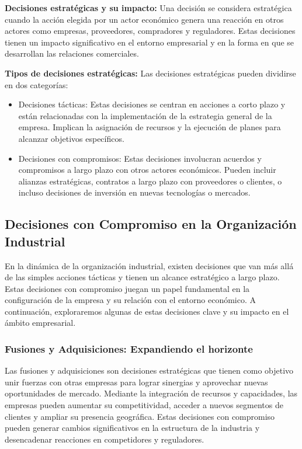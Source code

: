 \documentclass[
  letterpaper,
  DIV=11,
  numbers=noendperiod]{scrartcl}
\begin{document}
\textbf{Decisiones estratégicas y su impacto:} Una decisión se considera
estratégica cuando la acción elegida por un actor económico genera una
reacción en otros actores como empresas, proveedores, compradores y
reguladores. Estas decisiones tienen un impacto significativo en el
entorno empresarial y en la forma en que se desarrollan las relaciones
comerciales.

\textbf{Tipos de decisiones estratégicas:} Las decisiones estratégicas
pueden dividirse en dos categorías:

\begin{itemize}
\item
  Decisiones tácticas: Estas decisiones se centran en acciones a corto
  plazo y están relacionadas con la implementación de la estrategia
  general de la empresa. Implican la asignación de recursos y la
  ejecución de planes para alcanzar objetivos específicos.
\item
  Decisiones con compromisos: Estas decisiones involucran acuerdos y
  compromisos a largo plazo con otros actores económicos. Pueden incluir
  alianzas estratégicas, contratos a largo plazo con proveedores o
  clientes, o incluso decisiones de inversión en nuevas tecnologías o
  mercados.
\end{itemize}

\hypertarget{decisiones-con-compromiso-en-la-organizaciuxf3n-industrial}{%
\subsection{Decisiones con Compromiso en la Organización
Industrial}\label{decisiones-con-compromiso-en-la-organizaciuxf3n-industrial}}

En la dinámica de la organización industrial, existen decisiones que van
más allá de las simples acciones tácticas y tienen un alcance
estratégico a largo plazo. Estas decisiones con compromiso juegan un
papel fundamental en la configuración de la empresa y su relación con el
entorno económico. A continuación, exploraremos algunas de estas
decisiones clave y su impacto en el ámbito empresarial.

\hypertarget{fusiones-y-adquisiciones-expandiendo-el-horizonte}{%
\subsubsection{Fusiones y Adquisiciones: Expandiendo el
horizonte}\label{fusiones-y-adquisiciones-expandiendo-el-horizonte}}

Las fusiones y adquisiciones son decisiones estratégicas que tienen como
objetivo unir fuerzas con otras empresas para lograr sinergias y
aprovechar nuevas oportunidades de mercado. Mediante la integración de
recursos y capacidades, las empresas pueden aumentar su competitividad,
acceder a nuevos segmentos de clientes y ampliar su presencia
geográfica. Estas decisiones con compromiso pueden generar cambios
significativos en la estructura de la industria y desencadenar
reacciones en competidores y reguladores.
\end{document}
